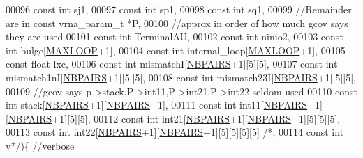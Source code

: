 \begin{DoxyCode}
00096           \textcolor{keyword}{const} \textcolor{keywordtype}{int} sj1,
00097           \textcolor{keyword}{const} \textcolor{keywordtype}{int} sp1,
00098           \textcolor{keyword}{const} \textcolor{keywordtype}{int} sq1,
00099     \textcolor{comment}{//Remainder are in const vrna\_param\_t *P,}
00100     \textcolor{comment}{//approx in order of how much gcov says they are used}
00101     \textcolor{keyword}{const} \textcolor{keywordtype}{int} TerminalAU,
00102     \textcolor{keyword}{const} \textcolor{keywordtype}{int} ninio2,
00103     \textcolor{keyword}{const} \textcolor{keywordtype}{int} bulge[\mbox{\hyperlink{energy__const_8h_ad1bd6eabac419670ddd3c9ed82145988}{MAXLOOP}}+1],
00104     \textcolor{keyword}{const} \textcolor{keywordtype}{int} internal\_loop[\mbox{\hyperlink{energy__const_8h_ad1bd6eabac419670ddd3c9ed82145988}{MAXLOOP}}+1],
00105     \textcolor{keyword}{const} \textcolor{keywordtype}{float} lxc,
00106     \textcolor{keyword}{const} \textcolor{keywordtype}{int} mismatchI[\mbox{\hyperlink{energy__const_8h_a5e75221c779d618eab81e096f37e32ce}{NBPAIRS}}+1][5][5],
00107     \textcolor{keyword}{const} \textcolor{keywordtype}{int} mismatch1nI[\mbox{\hyperlink{energy__const_8h_a5e75221c779d618eab81e096f37e32ce}{NBPAIRS}}+1][5][5],
00108     \textcolor{keyword}{const} \textcolor{keywordtype}{int} mismatch23I[\mbox{\hyperlink{energy__const_8h_a5e75221c779d618eab81e096f37e32ce}{NBPAIRS}}+1][5][5],
00109     \textcolor{comment}{//gcov says p->stack,P->int11,P->int21,P->int22 seldom used}
00110     \textcolor{keyword}{const} \textcolor{keywordtype}{int} stack[\mbox{\hyperlink{energy__const_8h_a5e75221c779d618eab81e096f37e32ce}{NBPAIRS}}+1][\mbox{\hyperlink{energy__const_8h_a5e75221c779d618eab81e096f37e32ce}{NBPAIRS}}+1],
00111     \textcolor{keyword}{const} \textcolor{keywordtype}{int} int11[\mbox{\hyperlink{energy__const_8h_a5e75221c779d618eab81e096f37e32ce}{NBPAIRS}}+1][\mbox{\hyperlink{energy__const_8h_a5e75221c779d618eab81e096f37e32ce}{NBPAIRS}}+1][5][5],
00112     \textcolor{keyword}{const} \textcolor{keywordtype}{int} int21[\mbox{\hyperlink{energy__const_8h_a5e75221c779d618eab81e096f37e32ce}{NBPAIRS}}+1][\mbox{\hyperlink{energy__const_8h_a5e75221c779d618eab81e096f37e32ce}{NBPAIRS}}+1][5][5][5],
00113     \textcolor{keyword}{const} \textcolor{keywordtype}{int} int22[\mbox{\hyperlink{energy__const_8h_a5e75221c779d618eab81e096f37e32ce}{NBPAIRS}}+1][\mbox{\hyperlink{energy__const_8h_a5e75221c779d618eab81e096f37e32ce}{NBPAIRS}}+1][5][5][5][5] \textcolor{comment}{/*,}
00114 \textcolor{comment}{    const int v*/})\{ \textcolor{comment}{//verbose}

\end{DoxyCode}
